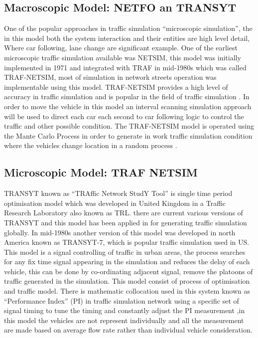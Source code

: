  \subsection{Macroscopic Model: NETFO an TRANSYT}
 One of the popular approaches in traffic simulation ``microscopic simulation'', the in this model both the system interaction and their entities are high level detail, Where car following, lane change are significant example. One of the earliest microscopic traffic simulation available was NETSIM, this model was initially implemented in 1971 and integrated with TRAF in mid-1980s which was called TRAF-NETSIM, most of simulation in network streets operation was implementable using this model. TRAF-NETSIM provides a high level of accuracy in traffic simulation and is popular in the field of traffic simulation \cite{sabra}. In order to move the vehicle in this model an interval scanning simulation approach will be used to direct each car each second to car following logic to control the traffic and other  possible condition. The TRAF-NETSIM model is operated using the Mante Carlo Process in order to generate in work traffic simulation condition where the vehicles change location in a random process \cite{rathi2}.
 
 \subsection{Microscopic Model: TRAF NETSIM}
 TRANSYT known as ``TRAffic Network StudY Tool'' is single time period optimisation model which was developed in United Kingdom in a Traffic Research Laboratory also known as TRL. there are current various versions of TRANSYT and this model has been applied in for generating traffic simulation globally. In mid-1980s another version of this model was developed in north America known as TRANSYT-7, which is popular traffic simulation used in US.  This model is a signal controlling of traffic in urban areas, the process searches for any fix time signal appearing in the simulation and reduces the delay of each vehicle, this can be done by co-ordinating adjacent signal, remove the platoons of traffic generated in the simulation. This model consist of process of optimisation and traffic model. There is mathematic collocation used in this system known as ``Performance Index'' (PI)  in traffic simulation network using a specific set of signal timing to tune the timing and constantly adjust the PI measurement \cite{chard},in this model the vehicles are not represent individually and all the measurement are made based on average flow rate rather than individual vehicle consideration.
 
